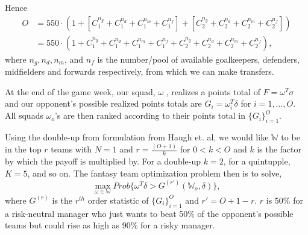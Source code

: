 \documentclass[12pt,oneside,a4paper]{book}
\theoremstyle{definition}
\theoremstyle{remark}
\begin{document}
					Hence
					\begin{equation*}
						\begin{aligned}
							O &= 550 \cdot (1 + [C_1^{n_g} +C_1^{n_d}+C_1^{n_m} +C_1^{n_f}] + [C_2^{n_g} +C_2^{n_d}+C_2^{n_m} +C_2^{n_f}])\\
							&= 550 \cdot  (1 + C_1^{n_g} +C_1^{n_d}+C_1^{n_m} +C_1^{n_f} + C_2^{n_g} +C_2^{n_d}+C_2^{n_m} +C_2^{n_f}),
						\end{aligned}
					\end{equation*}
					where $n_g,n_d,n_m$, and $n_f$ is the number/pool of available goalkeepers, defenders, midfielders and forwards respectively, from which we can make transfers.

					At the end of the game week, our squad, $\omega$ , realizes a points total of $F=\omega^T\sigma$ and our opponent’s possible realized points totals are $G_i=\omega_i^T\delta$  for $i = 1,\dots,O$. All squads $\omega_o$’s are then ranked according to their points total in $\{G_i\}^O_{i=1}$.

					Using the double-up from formulation from Haugh et. al\cite{haugh2021play}, we would like $\mathbb{W}$ to be in the top $r$ teams with $N=1$ and $r =\frac{(O+1)}{k}$ for $0 < k<O$ and $k$ is the factor by which the payoff is multiplied by. For a double-up $k=2$, for a quintupple, $K=5$, and so on.
					The fantasy team optimization problem then is to solve,
					\[
					\max_{\omega \in \mathbb{W}} Prob\{\omega^T\delta > G^{(r')}(\mathbb{W}_o,\delta)\},
					\]
					where $G^{(r)}$ is the $r^{th}$ order statistic of $\{G_i\}_{i=1}^O$ and $r' =O+1-r$.
					$r$ is 50\% for a risk-neutral manager who just wants to beat 50\% of the opponent's possible teams but could rise as high as 90\% for a risky manager.

%
\end{document}
